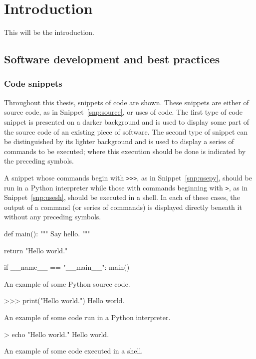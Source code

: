 \chapter{Introduction}
\label{chp:intro}

This will be the introduction.

\section{Software development and best practices}\label{sec:dev}

\subsection{Code snippets}

Throughout this thesis, snippets of code are shown. These snippets are either of
source code, as in Snippet~\ref{snp:source}, or uses of code. The first type of
code snippet is presented on a darker background and is used to display some
part of the source code of an existing piece of software. The second type of
snippet can be distinguished by its lighter background and is used to display a
series of commands to be executed; where this execution should be done is
indicated by the preceding symbols.

A snippet whose commands begin with \texttt{>>>}, as in
Snippet~\ref{snp:usepy}, should be run in a Python interpreter while those with
commands beginning with \texttt{>}, as in Snippet~\ref{snp:usesh},
should be executed in a shell. In each of these cases, the output of a command
(or series of commands) is displayed directly beneath it without any preceding
symbols.

\begin{listing}[htbp]
\begin{sourcepy}
def main():
    """ Say hello. """

    return "Hello world."

if __name__ == "__main__":
    main()
\end{sourcepy}
\caption{An example of some Python source code.}\label{snp:source}
\end{listing}

\begin{listing}[htbp]
\begin{usagepy}
>>> print("Hello world.")
Hello world.

\end{usagepy}
\caption{An example of some code run in a Python interpreter.}\label{snp:usepy}
\end{listing}

\begin{listing}[htbp]
\begin{usagesh}
> echo "Hello world."
Hello world.
\end{usagesh}
\caption{An example of some code executed in a shell.}\label{snp:usesh}
\end{listing}
